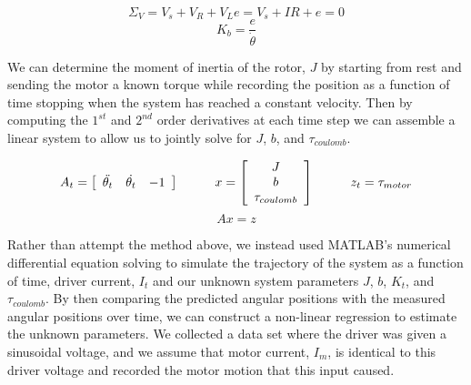 \documentclass{article}
\theoremstyle{plain}
\theoremstyle{definition}
\theoremstyle{remark}
\begin{document}
$$ \Sigma_{V} = V_{s} + V_{R} + V_{L} e = V_{s} + IR + e = 0 $$
$$ K_b = \frac{e}{\dot{\theta}} $$

%
%

%

We can determine the moment of inertia of the rotor, $J$ by starting from rest and sending the motor a known torque while recording the position as a function of time stopping when the system has reached a constant velocity.  Then by computing the $1^{st}$ and $2^{nd}$ order derivatives at each time step we can assemble a linear system to allow us to jointly solve for $J$, $b$, and $\tau_{coulomb}$.

$$ A_{t} = \left[ \begin{array}{c c c} \ddot{\theta_{t}} & \dot{\theta_{t}} & -1 \end{array} \right]  \hspace{1cm} 
x = \left[ \begin{array}{c} J \\ b \\ \tau_{coulomb} \end{array} \right] \hspace{1cm} z_{t} = \tau_{motor} $$
$$ Ax = z $$

Rather than attempt the method above, we instead used MATLAB's numerical differential equation solving to simulate the trajectory of the system as a function of time, driver current, $I_t$ and our unknown system parameters $J$, $b$, $K_t$, and $\tau_{coulomb}$.  By then
comparing the predicted angular positions with the measured angular positions over time, we can construct a non-linear regression to estimate the unknown parameters.  We collected a data set where the driver was given a sinusoidal voltage, and we assume that motor current, $I_m$, is identical to this driver voltage and recorded the motor motion that this input caused. \\
\end{document}
